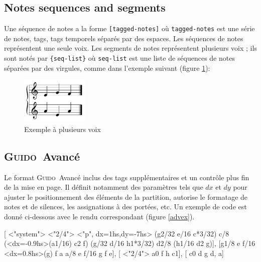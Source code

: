 \documentclass{article}
\newenvironment{gmncode}		{\vspace{-2mm}\small\verbatim}{\endverbatim\vspace{-2mm}}
\newcommand{\Guido}		{\textsc{Guido}}
\newcommand{\code}[1]		{{\small \texttt{#1}}}
\newcommand{\codeindent}	{\\ \hspace*{9mm}}
\begin{document}
\subsection{Notes sequences and segments}
Une séquence de notes a la forme \verb+[tagged-notes]+ où \code{tagged-notes} est une série de notes, tags, tags temporels séparés par des espaces. Les séquences de notes représentent une seule voix.
Les segments de notes représentent plusieurs voix ; ils sont notés par \verb+{seq-list}+ où \code{seq-list} est une liste de séquences de notes séparées par des virgules, comme dans l'exemple suivant (figure \ref{fig:voices}):
\codeindent\code{ \{ [ e g f ], [ a e a ] \} }
\begin{figure}[h]
	\centering \includegraphics[width=32mm]{rsrc/voices}
 \caption{Exemple à plusieurs voix}
 \label{fig:voices}
\end{figure}


\subsection{\Guido\ Avancé}
Le format \Guido\ Avancé inclus des tags supplémentaires et un contrôle plus fin de la mise en page.
Il définit notamment des paramètres tels que $dx$ et $dy$ pour ajuster le positionnement des éléments de la partition, autorise le formatage de notes et de silences, les assignations à des portées, etc.
Un exemple de code est donné ci-dessous avec le rendu correspondant (figure \ref{advex}).

\begin{gmncode} 
{
 [
  \barFormat<"system">
   \stemsUp \meter<"2/4"> 
  \intens<"p", dx=1hs,dy=-7hs>
  \beam(g2/32 e/16 c*3/32) c/8 
  \beam(\noteFormat<dx=-0.9hs>(a1/16) c2 f) 
  \beam(g/32 d/16 h1*3/32) d2/8 
  \beam(h1/16 d2 g)],
 [\stemsDown g1/8 e
  f/16 \noteFormat<dx=0.8hs>(g) f a a/8 e 
  f/16 g f e],
 [ \meter<"2/4"> 
  \stemsUp a0 f h c1],
 [ \stemsDown c0 d g {d, a}]
}
\end{gmncode} 
\end{document}
